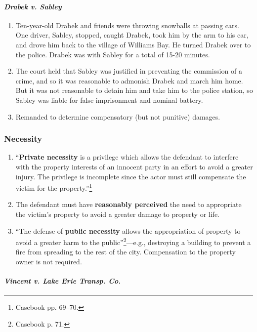 \paragraph{\emph{Drabek v. Sabley}}

\begin{enumerate}
    \item Ten-year-old Drabek and friends were throwing snowballs at passing 
    cars. One driver, Sabley, stopped, caught Drabek, took him by the arm to 
    his car, and drove him back to the village of Williams Bay. He turned 
    Drabek over to the police. Drabek was with Sabley for a total of 15-20 
    minutes.
    \item The court held that Sabley was justified in preventing the 
    commission of a crime, and so it was reasonable to admonish Drabek and 
    march him home. But it was not reasonable to detain him and take him to 
    the police station, so Sabley was liable for false imprisonment and 
    nominal battery.
    \item Remanded to determine compensatory (but not punitive) damages.
\end{enumerate}

\subsubsection{Necessity}

\begin{enumerate}
    \item ``\textbf{Private necessity} is a privilege which allows the defendant to 
    interfere with the property interests of an innocent party in an effort to 
    avoid a greater injury. The privilege is incomplete since the actor must 
    still compensate the victim for the property.''\footnote{Casebook pp. 
    69--70.}
    \item The defendant must have \textbf{reasonably perceived} the need to 
    appropriate the victim's property to avoid a greater damage to property or 
    life.
    \item ``The defense of \textbf{public necessity} allows the appropriation of 
    property to avoid a greater harm to the public''\footnote{Casebook p. 
    71.}---e.g., destroying a building to prevent a fire from spreading to the 
    rest of the city. Compensation to the property owner is not required.
\end{enumerate}

\paragraph{\emph{Vincent v. Lake Erie Transp. Co.}}

